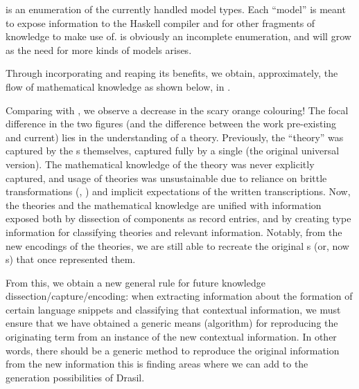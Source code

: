 \ModelKinds{} is an enumeration of the currently handled model types. Each
``model'' is meant to expose information to the Haskell compiler and for other
fragments of knowledge to make use of. \ModelKinds{} is obviously an incomplete
enumeration, and will grow as the need for more kinds of models arises.

Through incorporating \ModelKinds{} and reaping its benefits, we obtain,
approximately, the flow of mathematical knowledge as shown below, in
.

\theoriesWithModelKinds{}

Comparing  with , we
observe a decrease in the scary orange colouring! The focal difference in the
two figures (and the difference between the work pre-existing and current) lies
in the understanding of a theory. Previously, the ``theory'' was captured by the
\RelationConcept{}s themselves, captured fully by a single \Expr{} (the original
universal version). The mathematical knowledge of the theory was never
explicitly captured, and usage of theories was unsustainable due to reliance on
brittle transformations (\relToQD{}, ) and implicit
expectations of the written transcriptions. Now, the theories and the
mathematical knowledge are unified with information exposed both by dissection
of components as record entries, and by creating type information for
classifying theories and relevant information. Notably, from the new encodings
of the theories, we are still able to recreate the original \Expr{}s (or, now
\ModelExpr{}s) that once represented them.



From this, we obtain a new general rule for future knowledge
dissection/capture/encoding: when extracting information about the formation of
certain language snippets and classifying that contextual information, we must
ensure that we have obtained a generic means (algorithm) for reproducing the
originating term from an instance of the new contextual information. In other
words, there should be a generic method to reproduce the original information
from the new information \textemdash{} this is finding areas where we can add to the
generation possibilities of Drasil.

